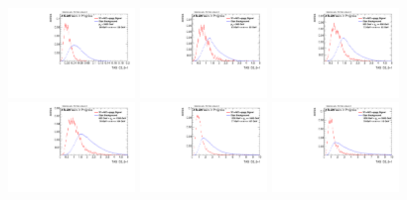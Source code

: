 \begin{figure}[H]
\includegraphics[width=0.3\textwidth]{sascha_input/Appendix/Distributions/w/distributions/beta1/h_assisted_tj_C2_bin6.pdf} 
\bigskip
\includegraphics[width=0.3\textwidth]{sascha_input/Appendix/Distributions/w/distributions/beta1/h_assisted_tj_D2_bin1.pdf} \hspace{1mm}
\includegraphics[width=0.3\textwidth]{sascha_input/Appendix/Distributions/w/distributions/beta1/h_assisted_tj_D2_bin2.pdf} \hspace{1mm}
\includegraphics[width=0.3\textwidth]{sascha_input/Appendix/Distributions/w/distributions/beta1/h_assisted_tj_D2_bin3.pdf} 
\bigskip
\includegraphics[width=0.3\textwidth]{sascha_input/Appendix/Distributions/w/distributions/beta1/h_assisted_tj_D2_bin4.pdf} \hspace{1mm}
\includegraphics[width=0.3\textwidth]{sascha_input/Appendix/Distributions/w/distributions/beta1/h_assisted_tj_D2_bin5.pdf} \hspace{1mm}

\end{figure}
